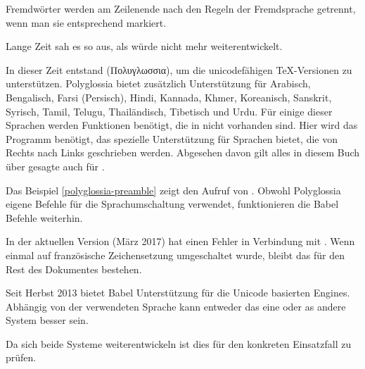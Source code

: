 Fremdwörter werden am Zeilenende nach den Regeln der Fremdsprache getrennt,
wenn man sie entsprechend markiert.

Lange Zeit sah es so aus, als würde  nicht mehr weiterentwickelt.

In dieser Zeit entstand  (Πολυγλωσσια), um die unicodefähigen \TeX{}-Versionen zu unterstützen.
Polyglossia bietet zusätzlich Unterstützung für Arabisch, Bengalisch, Farsi (Persisch), Hindi, Kannada, Khmer,
Koreanisch, Sanskrit, Syrisch, Tamil, Telugu, Thailändisch, Tibetisch und Urdu.
Für einige dieser Sprachen werden Funktionen benötigt, die in \LuaLaTeX{} nicht vorhanden sind.
Hier wird das Programm \XeLaTeX{} benötigt, das spezielle Unterstützung für Sprachen bietet,
die von Rechts nach Links geschrieben werden. Abgesehen davon gilt alles in diesem Buch über
\LuaLaTeX{} gesagte auch für \XeLaTeX{}.

Das Beispiel \ref{polyglossia-preamble} zeigt den Aufruf von .
Obwohl Polyglossia eigene Befehle für die Sprachumschaltung verwendet, 
funktionieren die Babel Befehle weiterhin.

In der aktuellen Version (März 2017) hat  einen Fehler in Verbindung mit \LuaLaTeX{}.
Wenn einmal auf französische Zeichensetzung umgeschaltet wurde, bleibt das für den Rest des Dokumentes bestehen.

Seit Herbst 2013 bietet Babel Unterstützung für die Unicode basierten Engines.
Abhängig von der verwendeten Sprache kann entweder das eine oder as andere System besser sein.

Da sich beide Systeme weiterentwickeln ist dies für den konkreten Einsatzfall zu prüfen.




